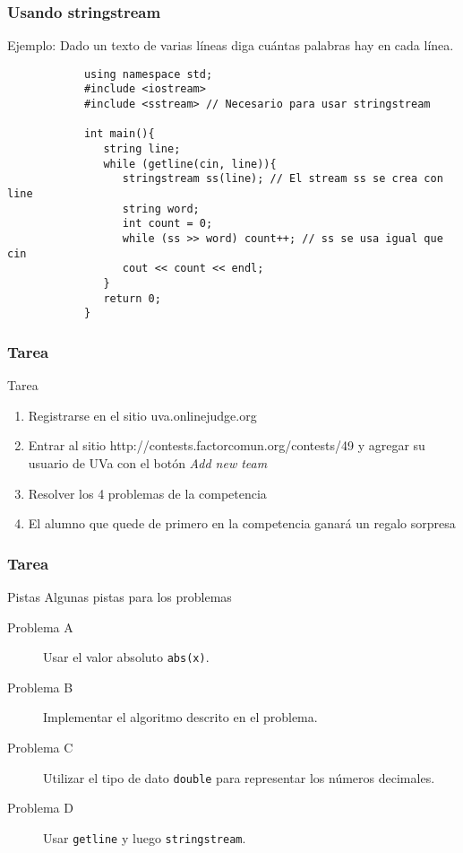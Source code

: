 \documentclass{beamer}
\begin{document}
	\begin{frame}[fragile]
		\frametitle{Usando stringstream}
		Ejemplo: Dado un texto de varias líneas diga cuántas palabras hay en cada línea.
		\begin{lstlisting}
			using namespace std;
			#include <iostream>
			#include <sstream> // Necesario para usar stringstream
			
			int main(){
			   string line;
			   while (getline(cin, line)){
			      stringstream ss(line); // El stream ss se crea con line
			      string word;
			      int count = 0;
			      while (ss >> word) count++; // ss se usa igual que cin
			      cout << count << endl;
			   }
			   return 0;
			}
		\end{lstlisting}
	\end{frame}
	
	\begin{frame}
		\frametitle{Tarea}
		\begin{alertblock}{Tarea}
			\begin{enumerate}
				\item Registrarse en el sitio uva.onlinejudge.org
				\item Entrar al sitio http://contests.factorcomun.org/contests/49 y agregar su usuario de UVa con el botón \emph{Add new team}
				\item Resolver los 4 problemas de la competencia
				\item El alumno que quede de primero en la competencia ganará un regalo sorpresa
			\end{enumerate}
		\end{alertblock}
	\end{frame}
	
	\begin{frame}[fragile]
		\frametitle{Tarea}
		\begin{exampleblock}{Pistas}
			Algunas pistas para los problemas
			\begin{description}
				\item [Problema A] Usar el valor absoluto \verb|abs(x)|.
				\item [Problema B] Implementar el algoritmo descrito en el problema.
				\item [Problema C] Utilizar el tipo de dato \verb|double| para representar los números decimales.
				\item [Problema D] Usar \verb|getline| y luego \verb|stringstream|.
			\end{description}
		\end{exampleblock}
	\end{frame}
\end{document}
